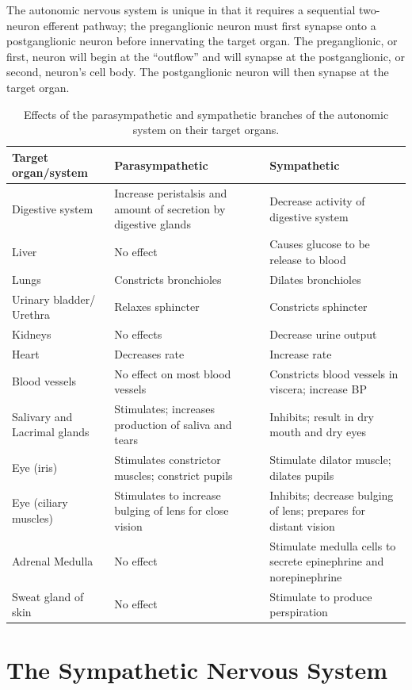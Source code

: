 The autonomic nervous system is unique in that it requires a sequential two-neuron efferent pathway; the preganglionic neuron must first synapse onto a postganglionic neuron before innervating the target organ. The preganglionic, or first, neuron will begin at the ``outflow'' and will synapse at the postganglionic, or second, neuron's cell body. The postganglionic neuron will then synapse at the target organ.
\onecolumn
\begin{table}
\caption{\label{tab:autonomic}Effects of the parasympathetic and sympathetic branches of the autonomic system on their target organs.}
\begin{tabular}[t]{>{\raggedright\arraybackslash}p{10em}>{\raggedright\arraybackslash}p{20em}>{\raggedright\arraybackslash}p{25em}}
\toprule
Target organ/system & Parasympathetic & Sympathetic\\
\midrule
\rowcolor{gray!6}  Digestive system & Increase peristalsis and amount of secretion by digestive glands & Decrease activity of digestive system\\
Liver & No effect & Causes glucose to be release to blood\\
\rowcolor{gray!6}  Lungs & Constricts bronchioles & Dilates bronchioles\\
Urinary bladder/ Urethra & Relaxes sphincter & Constricts sphincter\\
\rowcolor{gray!6}  Kidneys & No effects & Decrease urine output\\
\addlinespace
Heart & Decreases rate & Increase rate\\
\rowcolor{gray!6}  Blood vessels & No effect on most blood vessels & Constricts blood vessels in viscera; increase BP\\
Salivary and Lacrimal glands & Stimulates; increases production of saliva and tears & Inhibits; result in dry mouth and dry eyes\\
\rowcolor{gray!6}  Eye (iris) & Stimulates constrictor muscles; constrict pupils & Stimulate dilator muscle; dilates pupils\\
Eye (ciliary muscles) & Stimulates to increase bulging of lens for close vision & Inhibits; decrease bulging of lens; prepares for distant vision\\
\addlinespace
\rowcolor{gray!6}  Adrenal Medulla & No effect & Stimulate medulla cells to secrete epinephrine and norepinephrine\\
Sweat gland of skin & No effect & Stimulate to produce perspiration\\
\bottomrule
\end{tabular}
\end{table}
\twocolumn
\hypertarget{the-sympathetic-nervous-system}{%
\section{The Sympathetic Nervous System}\label{the-sympathetic-nervous-system}}

